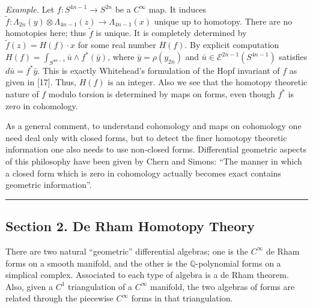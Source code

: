 \documentclass[
  english,
  a3paper,
  a3paper]{extarticle}
\begin{document}
\emph{Example.} Let \(f:S^{4n-1}\to S^{2n}\) be a \(C^\infty\) map. It
induces
\(\tilde f:\Lambda_{2n}(y)\otimes\Lambda_{4n-1}(z)\to\Lambda_{4n-1}(x)\)
unique up to homotopy. There are no homotopies here; thus \(\tilde f\)
is unique. It is completely determined by \(\tilde f(z)=H(f)\cdot x\)
for some real number \(H(f)\). By explicit computation
\(H(f)=\int_{S^{4n-1}}\bar u\wedge f^*(\bar y)\), where
\(\bar y=\rho(y_{2n})\) and \(\bar u\in\mathscr E^{2n-1}(S^{4n-1})\)
satisfies \(d\bar u=f^*\bar y\). This is exactly Whitehead's formulation
of the Hopf invariant of \(f\) as given in {[}17{]}. Thus, \(H(f)\) is
an integer. Also we see that the homotopy theoretic nature of \(f\)
modulo torsion is determined by maps on forms, even though \(f^*\) is
zero in cohomology.

As a general comment, to understand cohomology and maps on cohomology
one need deal only with closed forms, but to detect the finer homotopy
theoretic information one also needs to use non-closed forms.
Differential geometric aspects of this philosophy have been given by
Chern and Simons: ``The manner in which a closed form which is zero in
cohomology actually becomes exact contains geometric information''.

\clearpage



\par

\vspace{0.7mm}\hrule\vspace{1.6mm}

\fontsize{9}{11}\selectfont

\subsection{Section 2. De Rham Homotopy
Theory}\label{section-2.-de-rham-homotopy-theory}

There are two natural ``geometric'' differential algebras; one is the
\(C^\infty\) de Rham forms on a smooth manifold, and the other is the
\(\mathbb Q\)-polynomial forms on a simplical complex. Associated to
each type of algebra is a de Rham theorem. Also, given a \(C^1\)
triangulation of a \(C^\infty\) manifold, the two algebras of forms are
related through the piecewise \(C^\infty\) forms in that triangulation.
\end{document}
